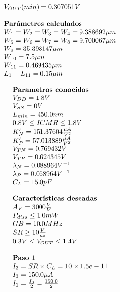 \begin{equation*}
\begin{array}{l l}
		V_{OUT}(min) =  0.307051  V \\
		\\
		\textbf{Parámetros calculados} \\
		W_{1} = W_{2} = W_{3} = W_{4} =  9.388692  \mu m \\
		W_{5} = W_{6} = W_{7} = W_{8} =  9.700067  \mu m \\
		W_{9} =  35.393147  \mu m \\
		W_{10} =  7.5  \mu m \\
		W_{11} =  0.469435  \mu m \\
		L_{1} - L_{11} =  0.15  \mu m \\
	\end{array}
\end{equation*}

\begin{equation}
	\begin{array}{l l}
		\textbf{Parametros conocidos} \\
		V_{DD} =  1.8  V \\
		V_{SS} =  0  V \\
		L_{min} =  450.0  nm \\
		0.8 V \leq ICMR \leq 1.8 V \\
		K'_{N} =  151.37604  \frac{\mu A}{V^{2}} \\
		K'_{P} =  57.013889  \frac{\mu A}{V^{2}} \\
		V_{TN} =  0.769432  V \\
		V_{TP} =  0.624345  V \\
		\lambda_{N} =  0.088964  V^{-1} \\
		\lambda_{P} =  0.068964  V^{-1} \\
		C_{L} =  15.0  pF \\
		\\
		\textbf{Características deseadas} \\
		A_{V} =  3000  \frac{V}{V} \\
		P_{diss} \leq  1.0  mW \\
		GB =  10.0  MHz \\
		SR \geq  10  \frac{V}{\mu s} \\
		0.3 V \leq V_{OUT} \leq 1.4 V \\
		\\
		\textbf{Paso 1} \\
		I_{3} = SR \times C_{L} = 10\times1.5e-11 \\
		I_{3} =  150.0 \mu A \\
		I_{1} = \frac{I_{3}}{2} = \frac{ 150.0 }{2} \\

\end{array}
\end{equation}
